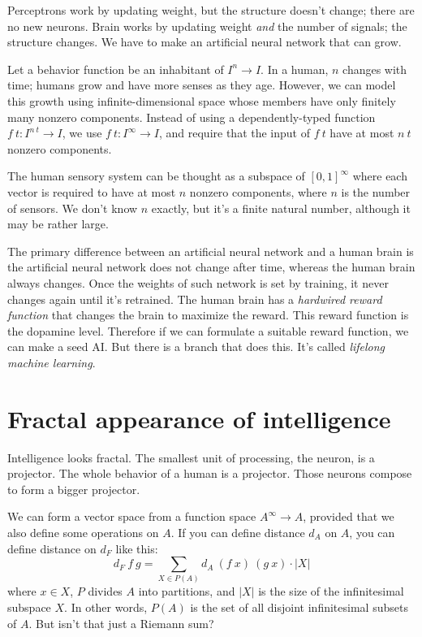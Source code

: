 Perceptrons work by updating weight, but the structure doesn't change;
there are no new neurons.
Brain works by updating weight \emph{and} the number of signals;
the structure changes.
We have to make an artificial neural network that can grow.

Let a behavior function be an inhabitant of \(I^n \to I\).
In a human, \(n\) changes with time;
humans grow and have more senses as they age.
However, we can model this growth
using infinite-dimensional space whose
members have only finitely many nonzero components.
Instead of using a dependently-typed function \(f~t : I^{n~t} \to I\),
we use \(f~t : I^\infty \to I\),
and require that the input of \(f~t\) have at most \(n~t\) nonzero components.

The human sensory system can be thought as a subspace
of \([0,1]^\infty\) where each vector
is required to have at most \(n\) nonzero components,
where \(n\) is the number of sensors.
We don't know \(n\) exactly,
but it's a finite natural number,
although it may be rather large.

The primary difference between an artificial neural network and a human brain
is the artificial neural network does not change after time,
whereas the human brain always changes.
Once the weights of such network is set by training,
it never changes again until it's retrained.
The human brain has a \emph{hardwired reward function}
that changes the brain to maximize the reward.
This reward function is the dopamine level.
Therefore if we can formulate a suitable reward function,
we can make a seed AI.
But there is a branch that does this.
It's called \emph{lifelong machine learning}.

\section{Fractal appearance of intelligence}

Intelligence looks fractal.
The smallest unit of processing, the neuron, is a projector.
The whole behavior of a human is a projector.
Those neurons compose to form a bigger projector.

We can form a vector space from a function space \(A^\infty \to A\),
provided that we also define some operations on \(A\).
If you can define distance \(d_A\) on \(A\),
you can define distance on \(d_F\) like this:
\[
    d_F~f~g = \sum_{X \in P(A)} d_A~(f~x)~(g~x) \cdot |X|
\]
where \(x \in X\), \(P\) divides \(A\) into partitions,
and \(|X|\) is the size of the infinitesimal subspace \(X\).
In other words, \(P(A)\) is the set of all disjoint infinitesimal subsets of \(A\).
But isn't that just a Riemann sum?


